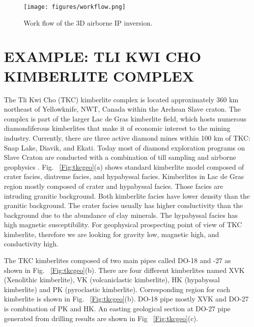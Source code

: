 \documentclass[letterpaper,11pt]{article}
\begin{document}
\begin{figure}[htb]
  \centering
  \texttt{[image: figures/workflow.png]}
  \caption{Work flow of the 3D airborne IP inversion. }
  \label{Fig:workflow}
\end{figure}
\clearpage

\section{EXAMPLE: TLI KWI CHO KIMBERLITE COMPLEX}
The Tli Kwi Cho (TKC) kimberlite complex is located approximately 360 km northeast of Yellowknife, NWT, Canada within the Archean Slave craton. The complex is part of the larger Lac de Gras kimberlite field, which hosts numerous diamondiferous kimberlites that make it of economic interest to the mining industry. Currently, there are three active diamond mines within 100 km of TKC: Snap Lake, Diavik, and Ekati. Today most of diamond exploration programs on Slave Craton are conducted with a combination of till sampling and airborne geophysics \cite[]{Pell1997}. Fig. ~\ref{Fig:tkcgeo}(a) shows standard kimberlite model composed of crater facies, diatreme facies, and hypabyssal facies. Kimberlites in Lac de Gras region mostly composed of crater and hypabyssal facies. Those facies are intruding granitic background. Both kimberlite facies have lower density than the granitic background. The crater facies usually has higher conductivity than the background due to the abundance of clay minerals. The hypabyssal facies has high magnetic susceptibility. For geophysical prospecting point of view of TKC kimberlite, therefore we are looking for gravity low, magnetic high, and conductivity high. 

The TKC kimberlites composed of two main pipes called DO-18 and -27 as shown in  Fig. ~\ref{Fig:tkcgeo}(b). There are four different kimberlites named XVK (Xenolithic kimberlite), VK (volcaniclastic kimberlite), HK (hypabyssal kimberlite) and PK (pyroclastic kimberlite). Corresponding region for each kimberlite is shown in Fig. ~\ref{Fig:tkcgeo}(b). DO-18 pipe mostly XVK and DO-27 is combination of PK and HK. An easting geological section at DO-27 pipe generated from drilling results \cite[]{HarderEtAl2006} are shown in Fig ~\ref{Fig:tkcgeo}(c). 
\end{document}
